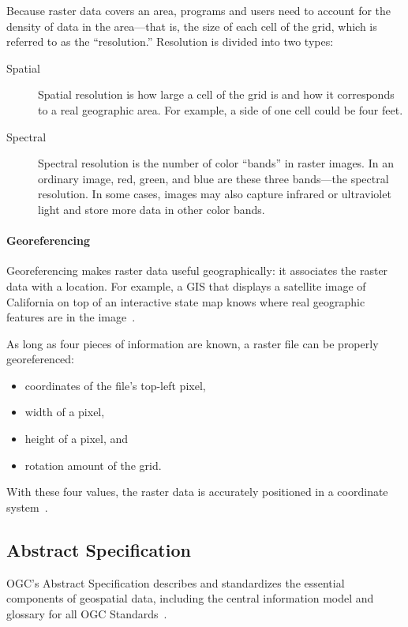 Because raster data covers an area, programs and users need to account for the density of data in the area---that is, the size of each cell of the grid, which is referred to as the ``resolution.'' Resolution is divided into two types:

\begin{description}
  \item[Spatial] Spatial resolution is how large a cell of the grid is and how it corresponds to a real geographic area. For example, a side of one cell could be four feet.
  \item[Spectral] Spectral resolution is the number of color ``bands'' in raster images. In an ordinary image, red, green, and blue are these three bands---the spectral resolution. In some cases, images may also capture infrared or ultraviolet light and store more data in other color bands.
\end{description}

\paragraph{Georeferencing}
Georeferencing makes raster data useful geographically: it associates the raster data with a location. For example, a GIS that displays a satellite image of California on top of an interactive state map knows where real geographic features are in the image~\cite{gentle_intro}.

As long as four pieces of information are known, a raster file can be properly georeferenced:

\begin{itemize}
  \item coordinates of the file's top-left pixel,
  \item width of a pixel,
  \item height of a pixel, and
  \item rotation amount of the grid.
\end{itemize}

With these four values, the raster data is accurately positioned in a coordinate system~\cite{gentle_intro}.

\subsection{Abstract Specification}
OGC's Abstract Specification describes and standardizes the essential components of geospatial data, including the central information model and glossary for all OGC Standards~\cite{AbstractSpecFaq}.

